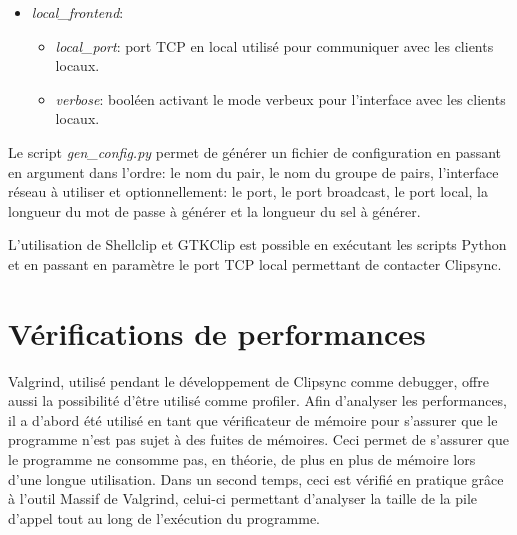 \begin{itemize}
\begin{itemize}
    être copiées sur les autres pairs.
  \item \emph{keepalive\_delay}: délai en millisecondes après lequel la
    connexion est fermée si aucun message OK n'est reçu.
  \item \emph{keepalive\_interval}: interval en millisecondes utilisé pour
    l'envoi de messages OK.
  \item \emph{verbose}, \emph{verbose\_bcast}, \emph{verbose\_peer}:
    booléens permettant d'activer ou de désactiver le mode verbeux
    \footnote{Le mode verbeux permet d'afficher sur la sortie standard
    des informations sur l'activité du logiciel.} de Clipsync.
  \end{itemize}
\item \emph{local\_frontend}:
  \begin{itemize}
  \item \emph{local\_port}: port TCP en local utilisé pour communiquer avec les
    clients locaux.
  \item \emph{verbose}: booléen activant le mode verbeux pour l'interface avec
    les clients locaux.
  \end{itemize}
\end{itemize}

Le script \emph{gen\_config.py} permet de générer un fichier de configuration
en passant en argument dans l'ordre: le nom du pair, le nom du groupe de pairs,
l'interface réseau à utiliser et optionnellement: le port, le port broadcast,
le port local, la longueur du mot de passe à générer et la longueur du
sel à générer.

L'utilisation de Shellclip et GTKClip est possible en exécutant les scripts
Python et en passant en paramètre le port TCP local permettant de contacter
Clipsync.

\section{Vérifications de performances}
Valgrind, utilisé pendant le développement de Clipsync comme debugger,
offre aussi la possibilité d'être utilisé comme profiler. Afin d'analyser
les performances, il a d'abord été utilisé en tant que vérificateur
de mémoire pour s'assurer que le programme n'est pas sujet à des fuites
de mémoires. Ceci permet de s'assurer que le programme ne consomme pas,
en théorie, de plus en plus de mémoire lors d'une longue utilisation.
Dans un second temps, ceci est vérifié en pratique grâce à l'outil
Massif de Valgrind, celui-ci permettant d'analyser la taille de la pile
d'appel tout au long de l'exécution du programme.

